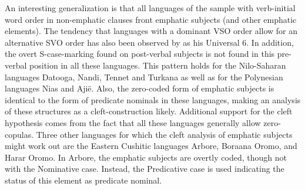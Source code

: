 An interesting generalization is that all languages of the sample with verb-initial word order in non-emphatic clauses front emphatic subjects (and other emphatic elements). 
The tendency that languages with a dominant VSO order allow for an alternative SVO order has also been observed by \citet{Greenberg:1963} as his Universal 6. 
In addition, the overt S-case-marking found on post-verbal subjects is not found in this pre-verbal position in all these languages. 
This pattern holds for the Nilo-Saharan languages Datooga, Nandi, Tennet and Turkana as well as for the Polynesian languages Nias and Aji\"e. 
Also, the zero-coded form of emphatic subjects is identical to the form of predicate nominals in these languages, making an analysis of these structures as a cleft-construction likely. Additional support for the cleft hypothesis comes from the fact that all these languages generally allow zero-copulas. 
Three other languages for which the cleft analysis of emphatic subjects might work out are the Eastern Cushitic languages Arbore, Boraana Oromo, and Harar Oromo. 
In Arbore, the emphatic subjects are overtly coded, though not with the Nominative case. 
Instead, the Predicative case is used indicating the status of this element as predicate nominal.  

